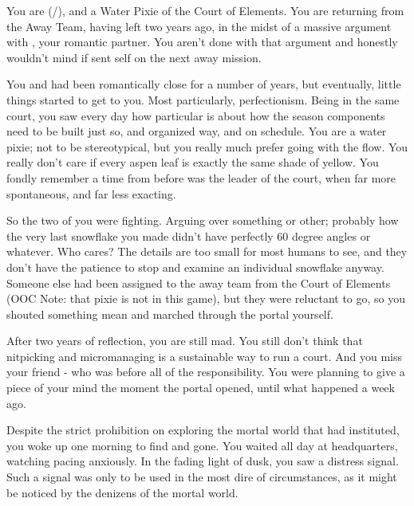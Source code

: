 \documentclass[char]{PP}
\begin{document}
\name{\cELove{}}

You are \cELove{} (\cELove{\They}/\cELove{\Them}), and a Water Pixie of the Court of Elements. You are returning from the Away Team, having left two years ago, in the midst of a massive argument with \cEHead{}, your romantic partner. You aren’t done with that argument and honestly wouldn’t mind if \cEHead{} sent \cEHead{\them}self on the next away mission.

You and \cEHead{} had been romantically close for a number of years, but eventually, little things started to get to you. Most particularly, \cEHead{\their} perfectionism. Being in the same court, you saw every day how particular \cEHead{} is about how the season components need to be built just so, and organized \cEHead{\their} way, and on \cEHead{\their} schedule. You are a water pixie; not to be stereotypical, but you really much prefer going with the flow. You really don’t care if every aspen leaf is exactly the same shade of yellow. You fondly remember a time from before \cEHead{} was the leader of the court, when \cEHead{\they} \cEHead{\were} far more spontaneous, and far less exacting.

So the two of you were fighting. Arguing over something or other; probably how the very last snowflake you made didn’t have perfectly 60 degree angles or whatever. Who cares? The details are too small for most humans to see, and they don’t have the patience to stop and examine an individual snowflake anyway. Someone else had been assigned to the away team from the Court of Elements (OOC Note: that pixie is not in this game), but they were reluctant to go, so you shouted something mean and marched through the portal yourself.

After two years of reflection, you are still mad. You still don’t think that nitpicking and micromanaging is a sustainable way to run a court. And you miss your friend - who \cEHead{} was before all of the responsibility. You were planning to give \cEHead{} a piece of your mind the moment the portal opened, until what happened a week ago.

Despite the strict prohibition on exploring the mortal world that \cSPM{} had instituted, you woke up one morning to find \cFLost{} and \cMChange{} gone. You waited all day at headquarters, watching \cSPM{} pacing anxiously. In the fading light of dusk, you saw a distress signal. Such a signal was only to be used in the most dire of circumstances, as it might be noticed by the denizens of the mortal world. 
\end{document}

